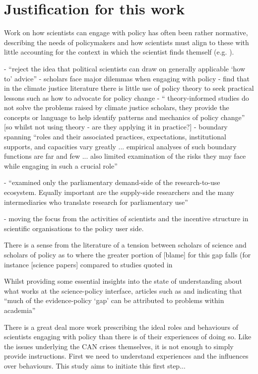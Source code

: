 \section{Justification for this work}
Work on how scientists can engage with policy has often been rather normative, describing the needs of policymakers and how scientists must align to these with little accounting for the context in which the scientist finds themself (e.g. \cite{McNie2007,GeddesDP2018,BlessenohlS2022,Bisbal2024}). 

\cite{CairneyO2020} - ``reject the idea that political scientists can draw on generally applicable `how to' advice''
\cite{CairneyO2020} - scholars face major dilemmas when engaging with policy
\cite{CairneyTS2023} - find that in the climate justice literature there is little use of policy theory to seek practical lessons such as how to advocate for policy change  - `` theory-informed studies do not solve the problems raised by climate justice scholars, they provide the concepts or language to help identify patterns and mechanics of policy change'' [so whilst not using theory - are they applying it in practice?]
\cite{JagannathanEtAl2023} - boundary spanning ``roles and their associated practices, expectations, institutional supports, and capacities vary greatly ... empirical analyses of such boundary functions are far and few ... also limited examination of the risks they may face while engaging in such a crucial role''

\cite{KennyRHTB2017} - ``examined only the parliamentary demand-side of the research-to-use ecosystem. Equally important are the supply-side researchers and the many intermediaries who translate research for parliamentary use''

\cite{EdlerKB2022} - moving the focus from the activities of scientists and the incentive structure in scientific organisations to the policy user side.

There is a sense from the literature of a tension between scholars of science and scholars of policy as to where the greater portion of [blame] for this gap falls (for instance [science papers] compared to studies quoted in 

Whilst providing some essential insights into the state of understanding about what works at the science-policy interface, articles such as \textcite{OliverHBGC2022} and \textcite{Oliver202X} indicating that ``much of the evidence-policy `gap' can be attributed to problems within academia''


There is a great deal more work prescribing the ideal roles and behaviours of scientists engaging with policy than there is of their experiences of doing so. Like the issues underlying the CAN crises themselves, it is not enough to simply provide instructions. First we need to understand experiences and the influences over behaviours. This study aims to initiate this first step...


